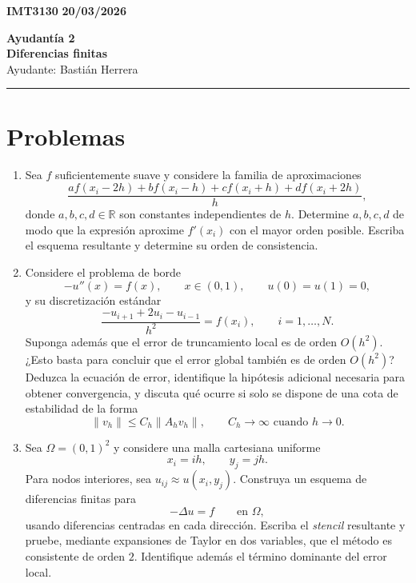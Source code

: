 \documentclass[11pt]{article}
\theoremstyle{thmstyle}
\def\R{\mathbb R}
\begin{document}
    \begin{flushleft}
        \small
        \vspace{1pt}
        \textbf{IMT3130} \hfill
        \textbf{20/03/2026}
    \end{flushleft}
    \begin{center}
        \LARGE\textbf{Ayudantía 2}\\
        \vspace{3pt}
        \normalsize\textbf{Diferencias finitas}\\
        \normalsize Ayudante: Bastián Herrera 
        \rule{\textwidth}{0.05mm}
    \end{center}

\section{Problemas}

\begin{enumerate}[label=\textbf{\arabic*.}, leftmargin=*]

    \item Sea $f$ suficientemente suave y considere la familia de aproximaciones
    \[
    \frac{a f(x_i-2h)+b f(x_i-h)+c f(x_i+h)+d f(x_i+2h)}{h},
    \]
    donde $a,b,c,d\in\R$ son constantes independientes de $h$.
    Determine $a,b,c,d$ de modo que la expresión aproxime $f'(x_i)$ con el mayor orden posible. Escriba el esquema resultante y determine su orden de consistencia.

    \item Considere el problema de borde
    \[
    -u''(x)=f(x), \qquad x\in(0,1), \qquad u(0)=u(1)=0,
    \]
    y su discretización estándar
    \[
    \frac{-u_{i+1}+2u_i-u_{i-1}}{h^2}=f(x_i), \qquad i=1,\dots,N.
    \]
    Suponga además que el error de truncamiento local es de orden $O(h^2)$. ¿Esto basta para concluir que el error global también es de orden $O(h^2)$? Deduzca la ecuación de error, identifique la hipótesis adicional necesaria para obtener convergencia, y discuta qué ocurre si solo se dispone de una cota de estabilidad de la forma
    \[
    \|v_h\|\le C_h\|A_hv_h\|,
    \qquad C_h\to\infty \text{ cuando } h\to 0.
    \]

    \item Sea $\Omega=(0,1)^2$ y considere una malla cartesiana uniforme
    \[
    x_i=ih,\qquad y_j=jh.
    \]
    Para nodos interiores, sea $u_{ij}\approx u(x_i,y_j)$. Construya un esquema de diferencias finitas para
    \[
    -\Delta u=f
    \qquad \text{en } \Omega,
    \]
    usando diferencias centradas en cada dirección. Escriba el \textit{stencil} resultante y pruebe, mediante expansiones de Taylor en dos variables, que el método es consistente de orden $2$. Identifique además el término dominante del error local.

\end{enumerate}
\end{document}
